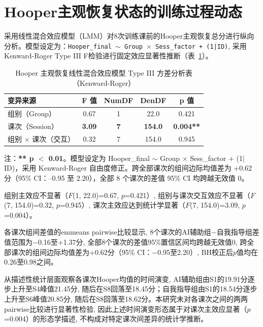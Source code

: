 \section{Hooper主观恢复状态的训练过程动态}
\label{sec:hooper}

采用线性混合效应模型（LMM）对8次训练课前的Hooper主观恢复总分进行纵向分析。模型设定为：\texttt{Hooper\_final $\sim$ Group $\times$ Sess\_factor + (1|ID)}, 采用Kenward-Roger Type III F检验进行固定效应显著性推断（表~\ref{tab:hooper_lmm}）。

\begin{table}[htbp]
\centering
\caption{Hooper 主观恢复线性混合效应模型 Type III 方差分析表（Kenward-Roger）}
\label{tab:hooper_lmm}
\begin{threeparttable}
\begin{tabular}{@{}lcccc@{}}
\toprule
\textbf{变异来源} & \textbf{F 值} & \textbf{NumDF} & \textbf{DenDF} & \textbf{p 值} \\
\midrule
组别（Group）              & 0.67 & 1 & 22.0  & 0.421 \\
课次（Session）            & \textbf{3.09} & \textbf{7} & \textbf{154.0} & \textbf{0.004**} \\
组别 $\times$ 课次（交互）  & 0.32 & 7 & 154.0 & 0.945 \\
\bottomrule
\end{tabular}
\begin{tablenotes}[flushleft]\footnotesize
\item 注：\textbf{** p $<$ 0.01}。模型设定为 Hooper\_final $\sim$ Group $\times$ Sess\_factor $+$ (1$\vert$ID)，采用 Kenward-Roger 自由度修正。跨全部课次的组间边际均值差为 +0.62 分（95\% CI：--0.95 至 2.20），全部 8 个课次的差值 95\% CI 均跨越无效值 0。
\end{tablenotes}
\end{threeparttable}
\end{table}

组别主效应不显著（$F$(1, 22.0)=0.67, $p$=0.421）, 组别与课次交互效应不显著（$F$(7, 154.0)=0.32, $p$=0.945）, 课次主效应达到统计学显著（$F$(7, 154.0)=3.09, $p$=0.004）。

各课次组间差值的emmeans pairwise比较显示, 8个课次的AI辅助组$-$自我指导组差值范围为$-$0.16至+1.37分, 全部8个课次的差值95\%置信区间均跨越无效值0, 跨全部课次的组间边际均值差为+0.62分（95\% CI：$-$0.95至2.20）, BH校正后$p$值均在0.26至0.98之间。

从描述性统计层面观察各课次Hooper均值的时间演变, AI辅助组由S1的19.91分逐步上升至S4峰值21.45分, 随后在S8回落至18.45分；自我指导组由S1的18.54分逐步上升至S6峰值20.85分, 随后在S8回落至18.62分。本研究未对各课次之间的两两pairwise比较进行显著性检验, 因此上述时间演变形态属于对课次主效应显著（$p$=0.004）的形态学描述, 不构成对特定课次间差异的统计学推断。

